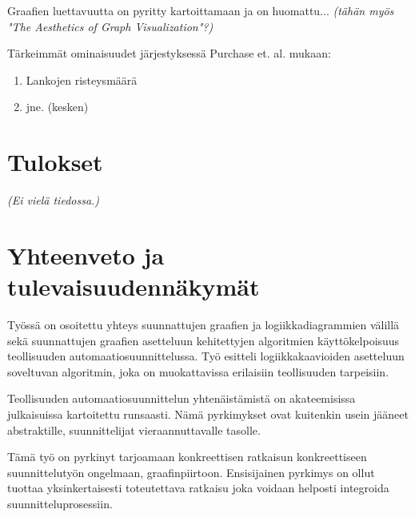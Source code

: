 \documentclass[finnish,12pt]{article}
\begin{document}
Graafien luettavuutta on pyritty kartoittamaan ja on huomattu... \cite{RefWorks:47}
\emph{(tähän myös "The Aesthetics of Graph Visualization"?)}

Tärkeimmät ominaisuudet järjestyksessä Purchase et. al. mukaan: 
\begin{enumerate}
  \item Lankojen risteysmäärä
  \item jne. (kesken)
\end{enumerate}

	\clearpage
	\section{Tulokset}
	
\emph{(Ei vielä tiedossa.)}

	\section{Yhteenveto ja tulevaisuudennäkymät}

Työssä on osoitettu yhteys suunnattujen graafien ja logiikkadiagrammien välillä sekä suunnattujen graafien asetteluun kehitettyjen algoritmien käyttökelpoisuus teollisuuden automaatiosuunnittelussa.
Työ esitteli logiikkakaavioiden asetteluun soveltuvan algoritmin, joka on muokattavissa erilaisiin teollisuuden tarpeisiin.

Teollisuuden automaatiosuunnittelun yhtenäistämistä on akateemisissa julkaisuissa kartoitettu runsaasti.
Nämä pyrkimykset ovat kuitenkin usein jääneet abstraktille, suunnittelijat vieraannuttavalle tasolle.

Tämä työ on pyrkinyt tarjoamaan konkreettisen ratkaisun konkreettiseen suunnittelutyön ongelmaan, graafinpiirtoon.
Ensisijainen pyrkimys on ollut tuottaa yksinkertaisesti toteutettava ratkaisu joka voidaan helposti integroida suunnitteluprosessiin.

\clearpage
{}


\end{document}
